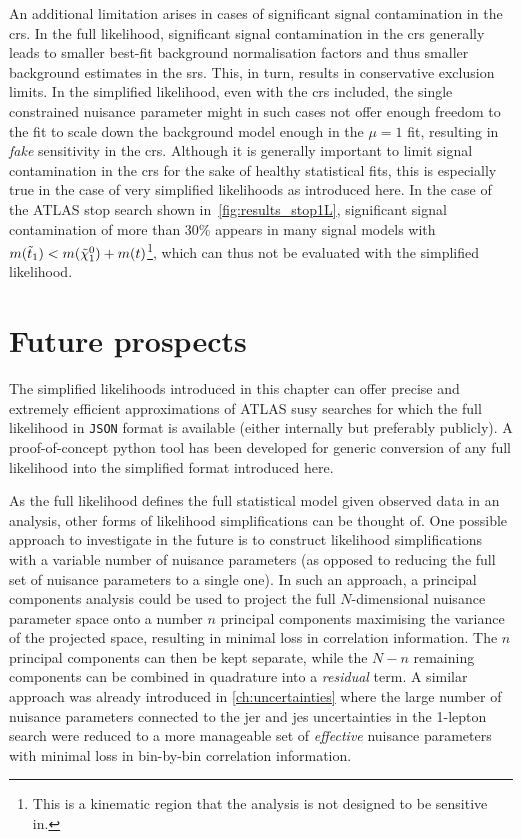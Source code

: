 An additional limitation arises in cases of significant signal contamination in the \glspl{cr}. In the full likelihood, significant signal contamination in the \glspl{cr} generally leads to smaller best-fit background normalisation factors and thus smaller background estimates in the \glspl{sr}. This, in turn, results in conservative exclusion limits. In the simplified likelihood, even with the \glspl{cr} included, the single constrained nuisance parameter might in such cases not offer enough freedom to the fit to scale down the background model enough in the $\mu = 1$ fit, resulting in \textit{fake} sensitivity in the \glspl{cr}. Although it is generally important to limit signal contamination in the \glspl{cr} for the sake of healthy statistical fits, this is especially true in the case of very simplified likelihoods as introduced here. In the case of the ATLAS stop search shown in~\cref{fig:results_stop1L}, significant signal contamination of more than 30\% appears in many signal models with $m(\tilde{t}_1) < m(\tilde{\chi}_1^0)+m(t)$\footnote{This is a kinematic region that the analysis is not designed to be sensitive in.}, which can thus not be evaluated with the simplified likelihood.

\section{Future prospects}

The simplified likelihoods introduced in this chapter can offer precise and extremely efficient approximations of ATLAS \gls{susy} searches for which the full likelihood in \texttt{JSON} format is available (either internally but preferably publicly). A proof-of-concept python tool has been developed for generic conversion of any full likelihood into the simplified format introduced here.

As the full likelihood defines the full statistical model given observed data in an analysis, other forms of likelihood simplifications can be thought of. One possible approach to investigate in the future is to construct likelihood simplifications with a variable number of nuisance parameters (as opposed to reducing the full set of nuisance parameters to a single one). In such an approach, a principal components analysis could be used to project the full $N$-dimensional nuisance parameter space onto a number $n$ principal components maximising the variance of the projected space, \ie resulting in minimal loss in correlation information. The $n$ principal components can then be kept separate, while the $N-n$ remaining components can be combined in quadrature into a \textit{residual} term. A similar approach was already introduced in \cref{ch:uncertainties} where the large number of nuisance parameters connected to the \gls{jer} and \gls{jes} uncertainties in the 1-lepton search were reduced to a more manageable set of \textit{effective} nuisance parameters with minimal loss in bin-by-bin correlation information. 

